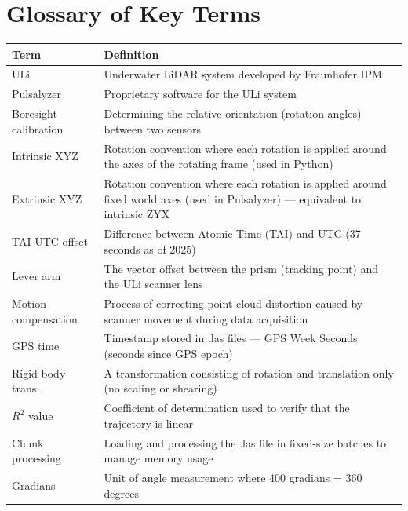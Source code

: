 \chapter{Glossary of Key Terms}

\begin{table}[h!]
\centering
\begin{tabular}{@{}lp{10cm}@{}}
\toprule
Term & Definition \\ \midrule
ULi & Underwater LiDAR system developed by Fraunhofer IPM \\
Pulsalyzer & Proprietary software for the ULi system \\
Boresight calibration & Determining the relative orientation (rotation angles) between two sensors \\
Intrinsic XYZ & Rotation convention where each rotation is applied around the axes of the rotating frame (used in Python) \\
Extrinsic XYZ & Rotation convention where each rotation is applied around fixed world axes (used in Pulsalyzer) --- equivalent to intrinsic ZYX \\
TAI-UTC offset & Difference between Atomic Time (TAI) and UTC (37 seconds as of 2025) \\
Lever arm & The vector offset between the prism (tracking point) and the ULi scanner lens \\
Motion compensation & Process of correcting point cloud distortion caused by scanner movement during data acquisition \\
GPS time & Timestamp stored in .las files --- GPS Week Seconds (seconds since GPS epoch) \\
Rigid body trans. & A transformation consisting of rotation and translation only (no scaling or shearing) \\
$R^2$ value & Coefficient of determination used to verify that the trajectory is linear \\
Chunk processing & Loading and processing the .las file in fixed-size batches to manage memory usage \\
Gradians & Unit of angle measurement where 400 gradians = 360 degrees \\ \bottomrule
\end{tabular}
\end{table}
